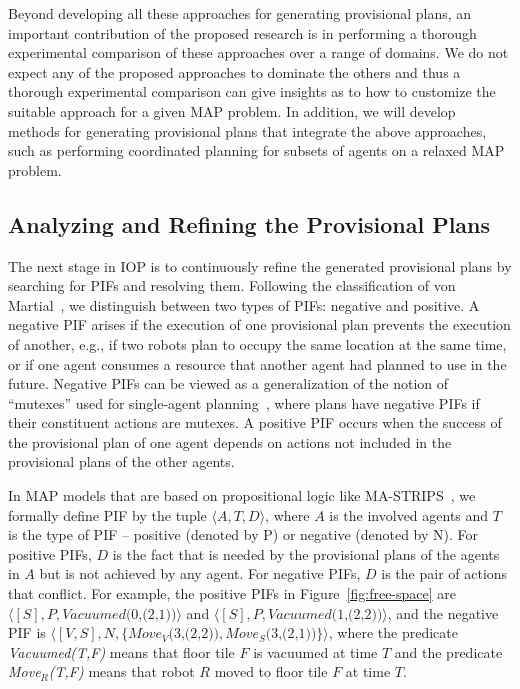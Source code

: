 \documentclass[11pt]{article}
\newcommand{\vac}[2]{\textit{Vacuumed(#1,#2)}}
\newcommand{\move}[3]{\textit{Move$_{#1}$(#2,#3)}}
\begin{document}
Beyond developing all these approaches for generating provisional plans, an important contribution of the proposed research is in performing a thorough experimental comparison of these approaches over a range of domains. We do not expect any of the proposed approaches to dominate the others and thus a thorough experimental comparison can give insights as to how to customize the suitable approach for a given MAP problem. In addition, we will develop methods for generating provisional plans that integrate the above approaches, such as performing coordinated planning for subsets of agents on a relaxed MAP problem. 



\subsection{Analyzing and Refining the Provisional Plans}
\label{sec:analyzing}
The next stage in IOP is to continuously refine the generated provisional plans by searching for PIFs and resolving them. Following the classification of von Martial~\cite{martial1992coordinating}, we distinguish between two types of PIFs: negative and positive. A negative PIF arises if the execution of one provisional plan prevents the execution of another, e.g.,  if two robots plan to occupy the same location at the same time, or if one agent consumes a resource that another agent had planned to use in the future. Negative PIFs can be viewed as a generalization of the notion of ``mutexes'' used for single-agent planning~\cite{blum1997fast,smith1999temporal,bonet2000planning}, where plans have negative PIFs if their constituent actions are mutexes.  A positive PIF occurs when the success of the provisional plan of one agent depends on actions not included in the provisional plans of the other agents. 

In MAP models that are based on propositional logic like MA-STRIPS~\cite{brafman2013complexity}, we formally define PIF by the tuple $\langle A,T,D\rangle$, where $A$ is the involved agents and $T$ is the type of PIF -- positive (denoted by P) or negative (denoted by N). For positive PIFs, $D$ is the fact that is needed by the provisional plans of the agents in $A$ but is not achieved by any agent. For negative PIFs, $D$ is the pair of actions that conflict. For example, the positive PIFs in Figure~\ref{fig:free-space} are  
$\langle [S], P, \vac{0}{(2,1)} \rangle$ and $\langle [S], P, \vac{1}{(2,2)} \rangle$, 
and the negative PIF is $\langle [V,S], N, \{ \move{V}{3}{(2,2)}, \move{S}{3}{(2,1)} \} \rangle$, where the predicate \vac{T}{F} means that floor tile $F$ is vacuumed at time $T$ and the predicate \move{R}{T}{F} means that robot $R$ moved to floor tile $F$ at time $T$. 
\end{document}
